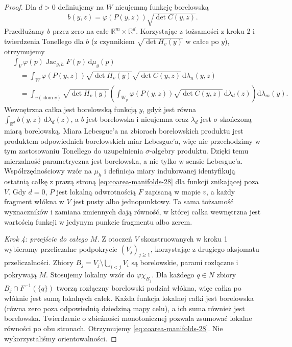 \begin{proof}
Dla $d>0$ definiujemy na $W$ nieujemną funkcję borelowską
\[
 b(y,z)=\varphi(P(y,z))\sqrt{\det C(y,z)}.
\]
Przedłużamy $b$ przez zero na całe $\mathbb R^m\times
\mathbb R^d$. Korzystając z tożsamości z kroku 2
i twierdzenia Tonellego dla $b$ (z czynnikiem
$\sqrt{\det H_v(y)}$ w całce po $y$), otrzymujemy
\begin{align*}
 &\int_V\varphi(p)\operatorname{Jac}_{g,h}F(p)\,\mathrm d\mu_g(p)\\
 &\quad=\int_W\varphi(P(y,z))\sqrt{\det H_v(y)}
      \sqrt{\det C(y,z)}\,\mathrm d\lambda_n(y,z)\\
 &\quad=\int_{v(\operatorname{dom} v)}
       \sqrt{\det H_v(y)}
       \left(\int_{W_y}\varphi(P(y,z))
              \sqrt{\det C(y,z)}\,\mathrm d\lambda_d(z)\right)
       \mathrm d\lambda_m(y).
\end{align*}
Wewnętrzna całka jest borelowską funkcją $y$, gdyż
jest równa $\int_{\mathbb R^d}b(y,z)\,\mathrm d\lambda_d(z)$,
a $b$ jest borelowska i nieujemna oraz $\lambda_d$
jest $\sigma$-skończoną miarą borelowską.
Miara Lebesgue'a na zbiorach borelowskich produktu
jest produktem odpowiednich borelowskich miar
Lebesgue'a, więc nie przechodzimy w tym zastosowaniu
Tonellego do uzupełnienia $\sigma$-algebry produktu.
Dzięki temu mierzalność parametryczna jest
borelowska, a nie tylko w sensie Lebesgue'a.
Współrzędnościowy wzór na $\mu_h$ i definicja miary
indukowanej identyfikują ostatnią całkę z prawą stroną
\eqref{eq:coarea-manifolds-28} dla funkcji znikającej
poza $V$. Gdy $d=0$, $P$ jest lokalną odwrotnością
$F$ zapisaną w mapie $v$, a każdy fragment włókna w $V$
jest pusty albo jednopunktowy. Ta sama tożsamość
wyznaczników i zamiana zmiennych dają równość,
w której całka wewnętrzna jest wartością funkcji
w jedynym punkcie fragmentu albo zerem.

\emph{Krok 4: przejście do całego $M$.}
Z otoczeń $V$ skonstruowanych w kroku 1 wybieramy
przeliczalne podpokrycie $(V_j)_{j\ge1}$, korzystając
z drugiego aksjomatu przeliczalności. Zbiory
$B_j=V_j\setminus\bigcup_{i<j}V_i$ są borelowskie,
parami rozłączne i pokrywają $M$.
Stosujemy lokalny wzór do $\varphi\chi_{B_j}$.
Dla każdego $q\in N$ zbiory $B_j\cap F^{-1}(\{q\})$
tworzą rozłączny borelowski podział włókna, więc
całka po włóknie jest sumą lokalnych całek.
Każda funkcja lokalnej całki jest borelowska
(równa zero poza odpowiednią dziedziną mapy celu),
a ich suma również jest borelowska.
Twierdzenie o zbieżności monotonicznej pozwala
zsumować lokalne równości po obu stronach.
Otrzymujemy \eqref{eq:coarea-manifolds-28}.
Nie wykorzystaliśmy orientowalności.
\end{proof}

